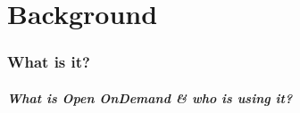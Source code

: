 \part{Background}
\begin{frame}
			 \partpage
\end{frame}

\section[What]{What is it?}

\begin{frame}
	\frametitle{What is Open OnDemand \& who is using it?}
	\begin{columns}
	\begin{column}{0.50\textwidth}


\end{column}
\end{columns}
\end{frame}
